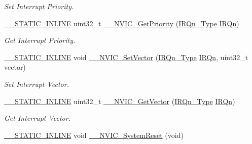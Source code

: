 \begin{DoxyCompactItemize}
\begin{DoxyCompactList}\small\item\em Set Interrupt Priority. \end{DoxyCompactList}\item 
\mbox{\hyperlink{cmsis__iccarm_8h_aba87361bfad2ae52cfe2f40c1a1dbf9c}{\+\_\+\+\_\+\+S\+T\+A\+T\+I\+C\+\_\+\+I\+N\+L\+I\+NE}} uint32\+\_\+t \mbox{\hyperlink{group___c_m_s_i_s___core___n_v_i_c_functions_gaeb9dc99c8e7700668813144261b0bc73}{\+\_\+\+\_\+\+N\+V\+I\+C\+\_\+\+Get\+Priority}} (\mbox{\hyperlink{group___interrupt__vector__numbers_gac3af4a32370fb28c4ade8bf2add80251}{I\+R\+Qn\+\_\+\+Type}} \mbox{\hyperlink{group___interrupt__vector__numbers_ga666eb0caeb12ec0e281415592ae89083}{I\+R\+Qn}})
\begin{DoxyCompactList}\small\item\em Get Interrupt Priority. \end{DoxyCompactList}\item 
\mbox{\hyperlink{cmsis__iccarm_8h_aba87361bfad2ae52cfe2f40c1a1dbf9c}{\+\_\+\+\_\+\+S\+T\+A\+T\+I\+C\+\_\+\+I\+N\+L\+I\+NE}} void \mbox{\hyperlink{group___c_m_s_i_s___core___n_v_i_c_functions_ga0df355460bc1783d58f9d72ee4884208}{\+\_\+\+\_\+\+N\+V\+I\+C\+\_\+\+Set\+Vector}} (\mbox{\hyperlink{group___interrupt__vector__numbers_gac3af4a32370fb28c4ade8bf2add80251}{I\+R\+Qn\+\_\+\+Type}} \mbox{\hyperlink{group___interrupt__vector__numbers_ga666eb0caeb12ec0e281415592ae89083}{I\+R\+Qn}}, uint32\+\_\+t vector)
\begin{DoxyCompactList}\small\item\em Set Interrupt Vector. \end{DoxyCompactList}\item 
\mbox{\hyperlink{cmsis__iccarm_8h_aba87361bfad2ae52cfe2f40c1a1dbf9c}{\+\_\+\+\_\+\+S\+T\+A\+T\+I\+C\+\_\+\+I\+N\+L\+I\+NE}} uint32\+\_\+t \mbox{\hyperlink{group___c_m_s_i_s___core___n_v_i_c_functions_ga44b665d2afb708121d9b10c76ff00ee5}{\+\_\+\+\_\+\+N\+V\+I\+C\+\_\+\+Get\+Vector}} (\mbox{\hyperlink{group___interrupt__vector__numbers_gac3af4a32370fb28c4ade8bf2add80251}{I\+R\+Qn\+\_\+\+Type}} \mbox{\hyperlink{group___interrupt__vector__numbers_ga666eb0caeb12ec0e281415592ae89083}{I\+R\+Qn}})
\begin{DoxyCompactList}\small\item\em Get Interrupt Vector. \end{DoxyCompactList}\item 
\mbox{\hyperlink{cmsis__iccarm_8h_aba87361bfad2ae52cfe2f40c1a1dbf9c}{\+\_\+\+\_\+\+S\+T\+A\+T\+I\+C\+\_\+\+I\+N\+L\+I\+NE}} void \mbox{\hyperlink{group___c_m_s_i_s___core___n_v_i_c_functions_ga49f66a3782cbff3b821bd9802cd046f5}{\+\_\+\+\_\+\+N\+V\+I\+C\+\_\+\+System\+Reset}} (void)

\end{DoxyCompactItemize}
